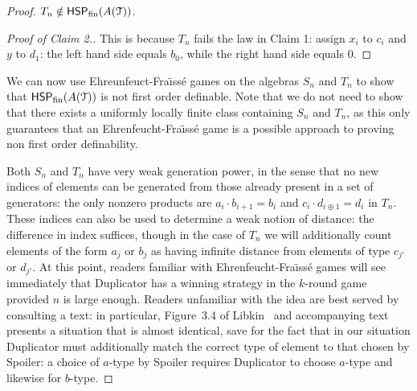 \documentclass[reqno]{amsart}
\theoremstyle{plain}
\theoremstyle{definition}
\begin{document}
\begin{proof}
 $T_n\notin \mathsf{HSP}_{\rm fin}(A(\mathcal{T}))$.
\begin{proof}[Proof of Claim 2.]
This is because $T_n$ fails the law in Claim 1: assign $x_i$ to $c_i$ and $y$ to $d_1$: the left hand side equals $b_0$, while the right hand side equals $0$.
\end{proof}

We can now use Ehreunfeuct-Fra\"{\i}ss\'e games on the algebras $S_n$ and $T_n$ to show that $\mathsf{HSP}_{\rm fin}(A(\mathcal{T}))$ is not first order definable.  Note that we do not need to show that there exists a uniformly locally finite class containing $S_n$ and $T_n$, as this only guarantees that an Ehrenfeucht-Fra\"{\i}ss\'e game is a possible approach to proving non first order definability.

Both $S_n$ and $T_n$ have very weak generation power, in the sense that no new indices of elements can be generated from those already present in a set of generators: the only nonzero products are $a_i\cdot b_{i+1}=b_i$ and $c_i\cdot d_{i\oplus 1}=d_i$ in $T_n$.  These indices can also be used to determine a weak notion of distance: the difference in index suffices, though in the case of $T_n$ we will additionally count elements of the form $a_j$ or $b_j$ as having infinite distance from  elements of type $c_{j'}$ or $d_{j'}$.
At this point, readers familiar with Ehrenfeucht-Fra\"{\i}ss\'e games will see immediately that Duplicator has a winning strategy in the $k$-round game provided $n$ is large enough.  Readers unfamiliar with the idea are best served by consulting a text: in particular, Figure~3.4 of Libkin~\cite{lib} and accompanying text presents a situation that is almost identical, save for the fact that in our situation Duplicator must additionally match the correct type of element to that chosen by Spoiler: a choice of $a$-type by Spoiler requires Duplicator to choose $a$-type and likewise for $b$-type.  
\end{proof}


\end{document}
